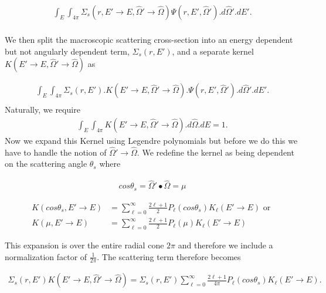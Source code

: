 \documentclass[11pt,letterpaper,titlepage]{article}
\numberwithin{equation}{section}
\begin{document}
\begin{align*}
\int_E \int_{4\pi}
\Sigma_s (r,E'{\to} E,\hat{\Omega}' {\to} \hat{\Omega}) \Psi (r,E',\hat{\Omega}') 
.d\hat{\Omega}'.dE'.\\
\end{align*}

We then split the macroscopic scattering cross-section into an energy dependent but not angularly dependent term, $\Sigma_s (r,E')$, and a separate kernel $K(E'{\to}E,\hat{\Omega}'{\to}\hat{\Omega})$ as 

\begin{align*}
\int_E \int_{4\pi}
\Sigma_s (r,E').K(E'{\to}E,\hat{\Omega}'{\to}\hat{\Omega}).\Psi (r,E',\hat{\Omega}') 
.d\hat{\Omega}'.dE'.\\
\end{align*}
\newline
Naturally, we require 
\begin{align} \label{eq:kernelIntegralUnity}
\int_E\int_{4\pi}
K(E'{\to}E,\hat{\Omega}'{\to}\hat{\Omega}) 
.d\hat{\Omega}.dE=1.
\end{align}
\newline
Now we expand this Kernel using Legendre polynomials but before we do this we have to handle the notion of $\hat{\Omega}'{\to}\hat{\Omega}$. We redefine the kernel as being dependent on the scattering angle $\theta_s$ where

\begin{align*}
cos\theta_s = \hat{\Omega}'\bullet\hat{\Omega} = \mu
\end{align*}

\begin{align*}
K(cos\theta_s,E'{\to}E) &= \sum_{\ell=0}^\infty \frac{2\ell+1}{2} P_\ell (cos\theta_s) K_\ell (E'{\to}E) \text{ or } \\
K(\mu,E'{\to}E) &= \sum_{\ell=0}^\infty \frac{2\ell+1}{2} P_\ell (\mu) K_\ell (E'{\to}E)
\end{align*}

\noindent This expansion is over the entire radial cone $2\pi$ and therefore we include a normalization factor of $\frac{1}{2\pi}$. The scattering term therefore becomes

\begin{align} \label{eq:scatterKernelLegendre}
\Sigma_s (r,E')K(E'{\to}E,\hat{\Omega}'{\to}\hat{\Omega}) = \Sigma_s (r,E')
\sum_{\ell=0}^\infty \frac{2\ell+1}{4\pi} P_\ell (cos\theta_s) K_\ell (E'{\to}E).
\end{align} 
\end{document}
